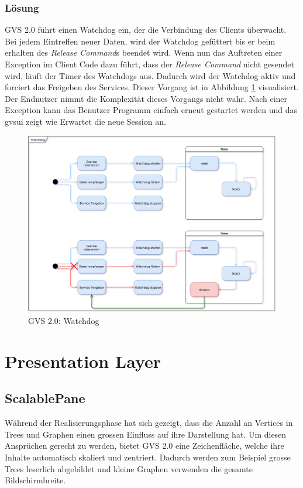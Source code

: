 \documentclass[11pt,a4paper,english,oneside]{book}
\numberwithin{equation}{chapter}
\begin{document}
	\subsubsection{Lösung}
	GVS 2.0 führt einen Watchdog ein, der die Verbindung des Clients überwacht. Bei jedem Eintreffen neuer Daten, wird der Watchdog gefüttert bis er beim erhalten des \textit{Release Command}s beendet wird. Wenn nun das Auftreten einer Exception im Client Code dazu führt, dass der \textit{Release Command} nicht gesendet wird, läuft der Timer des Watchdogs aus. Dadurch wird der Watchdog aktiv und forciert das Freigeben des Services. Dieser Vorgang ist in Abbildung \ref{fig:watchdog} visualisiert.\\
	Der Endnutzer nimmt die Komplexität dieses Vorgangs nicht wahr. Nach einer Exception kann das Benutzer Programm einfach erneut gestartet werden und das \gls{gvsui} zeigt wie Erwartet die neue Session an.
	
	\begin{figure}[h!]
		\centering
		\includegraphics[width=0.7\linewidth]{assets/images/watchdog}
		\caption{GVS  2.0: Watchdog}
		\label{fig:watchdog}
	\end{figure}
	
	
	\section{Presentation Layer}
	
	\subsection{ScalablePane}
	Während der Realisierungsphase hat sich gezeigt, dass die Anzahl an Vertices in Trees und Graphen einen grossen Einfluss auf ihre Darstellung hat. Um diesen Ansprüchen gerecht zu werden, bietet GVS 2.0 eine Zeichenfläche, welche ihre Inhalte automatisch skaliert und zentriert. Dadurch werden zum Beispiel grosse Trees leserlich abgebildet und kleine Graphen verwenden die gesamte Bildschirmbreite. 
	
\end{document}
